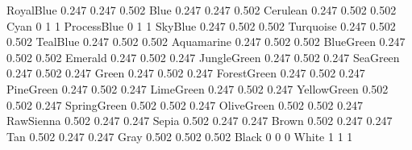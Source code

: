 \newColor RoyalBlue {0.247 0.247 0.502} %
\newColor Blue {0.247 0.247 0.502}      %
\newColor Cerulean {0.247 0.502 0.502}   %
\newColor Cyan {0 1 1}                  %
\newColor ProcessBlue {0 1 1}           %
\newColor SkyBlue {0.247 0.502 0.502}   %
\newColor Turquoise {0.247 0.502 0.502}  %
\newColor TealBlue {0.247 0.502 0.502}  %
\newColor Aquamarine {0.247 0.502 0.502} %
\newColor BlueGreen {0.247 0.502 0.502} %
\newColor Emerald {0.247 0.502 0.247}   %
\newColor JungleGreen {0.247 0.502 0.247} %
\newColor SeaGreen {0.247 0.502 0.247}  %
\newColor Green {0.247 0.502 0.247}     %
\newColor ForestGreen {0.247 0.502 0.247} %
\newColor PineGreen {0.247 0.502 0.247}  %
\newColor LimeGreen {0.247 0.502 0.247}  %
\newColor YellowGreen {0.502 0.502 0.247} %
\newColor SpringGreen {0.502 0.502 0.247} %
\newColor OliveGreen {0.502 0.502 0.247}  %
\newColor RawSienna {0.502 0.247 0.247}   %
\newColor Sepia {0.502 0.247 0.247}       %
\newColor Brown {0.502 0.247 0.247}       %
\newColor Tan {0.502 0.247 0.247}         %
\newColor Gray {0.502 0.502 0.502}        %
\newColor Black {0 0 0}                   %
\newColor White {1 1 1}                   %
